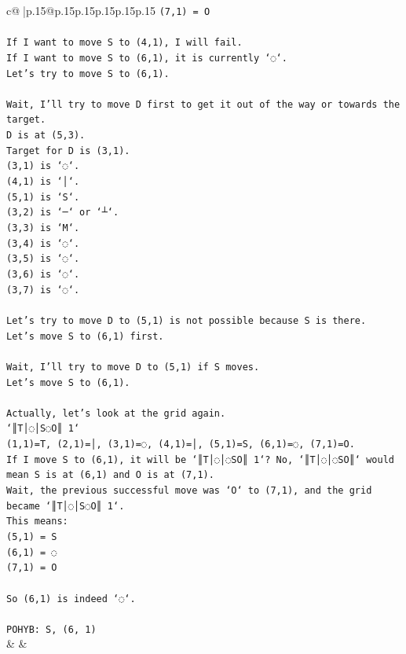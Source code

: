 \documentclass{article}
\begin{document}
{\begin{supertabular}{c@{$\;$}|p{.15\linewidth}@{}p{.15\linewidth}p{.15\linewidth}p{.15\linewidth}p{.15\linewidth}p{.15\linewidth}}
{{{\texttt{(7,1) = O} \\
\\ 
\texttt{If I want to move S to (4,1), I will fail.} \\
\texttt{If I want to move S to (6,1), it is currently `◌`.} \\
\texttt{Let's try to move S to (6,1).} \\
\\ 
\texttt{Wait, I'll try to move D first to get it out of the way or towards the target.} \\
\texttt{D is at (5,3).} \\
\texttt{Target for D is (3,1).} \\
\texttt{(3,1) is `◌`.} \\
\texttt{(4,1) is `│`.} \\
\texttt{(5,1) is `S`.} \\
\texttt{(3,2) is `─` or `┴`.} \\
\texttt{(3,3) is `M`.} \\
\texttt{(3,4) is `◌`.} \\
\texttt{(3,5) is `◌`.} \\
\texttt{(3,6) is `◌`.} \\
\texttt{(3,7) is `◌`.} \\
\\ 
\texttt{Let's try to move D to (5,1) is not possible because S is there.} \\
\texttt{Let's move S to (6,1) first.} \\
\\ 
\texttt{Wait, I'll try to move D to (5,1) if S moves.} \\
\texttt{Let's move S to (6,1).} \\
\\ 
\texttt{Actually, let's look at the grid again.} \\
\texttt{`║T│◌│S◌O║ 1`} \\
\texttt{(1,1)=T, (2,1)=│, (3,1)=◌, (4,1)=│, (5,1)=S, (6,1)=◌, (7,1)=O.} \\
\texttt{If I move S to (6,1), it will be `║T│◌│◌SO║ 1`? No, `║T│◌│◌SO║` would mean S is at (6,1) and O is at (7,1).} \\
\texttt{Wait, the previous successful move was `O` to (7,1), and the grid became `║T│◌│S◌O║ 1`.} \\
\texttt{This means:} \\
\texttt{(5,1) = S} \\
\texttt{(6,1) = ◌} \\
\texttt{(7,1) = O} \\
\\ 
\texttt{So (6,1) is indeed `◌`.} \\
\\ 
\texttt{POHYB: S, (6, 1)} \\
            }
        }
    }
    & & \\ \\


\end{supertabular}}
\end{document}
